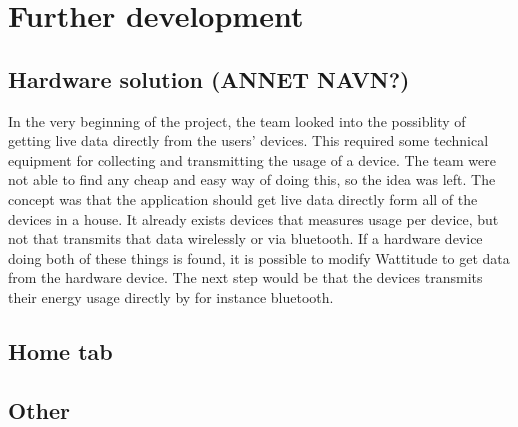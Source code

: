\chapter{Further development}

\section{Hardware solution (ANNET NAVN?)}
In the very beginning of the project, the team looked into the possiblity of getting live data directly from the users' devices. This required some technical equipment for collecting and transmitting the usage of a device. The team were not able to find any cheap and easy way of doing this, so the idea was left. The concept was that the application should get live data directly form all of the devices in a house. It already exists devices that measures usage per device, but not that transmits that data wirelessly or via bluetooth. If a hardware device doing both of these things is found, it is possible to modify Wattitude to get data from the hardware device. The next step would be that the devices transmits their energy usage directly by for instance bluetooth. 

\section{Home tab}

\section{Other}